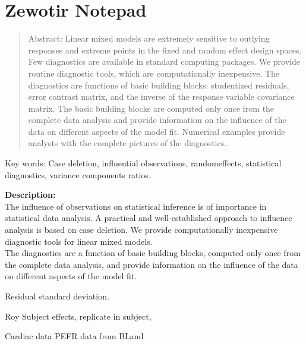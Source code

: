 \documentclass[12pt, a4paper]{article}
\begin{document}



\newpage

\section{Zewotir Notepad}

\begin{quote}
	Abstract: Linear mixed models are extremely sensitive to outlying responses and extreme points in the fixed and random effect design spaces. Few diagnostics are available in standard computing packages. We provide routine diagnostic tools, which are computationally inexpensive. The diagnostics
	are functions of basic building blocks: studentized residuals, error contrast matrix, and the inverse of the response variable covariance matrix. The basic building blocks are computed only once from the complete data analysis and provide information on the influence of the data on different aspects
	of the model fit. Numerical examples provide analysts with the complete pictures of the diagnostics.
\end{quote}
Key words: Case deletion, influential observations, randomeffects, statistical
diagnostics, variance components ratios.


\textbf{Description:}\\ The influence of observations on statistical inference is of importance in statistical data analysis. 
A practical and well-established approach to influence analysis is based on case deletion. 
We provide computationally inexpensive diagnostic tools for linear mixed models. \\
The diagnostics are a function of basic building blocks, computed only once from the complete data analysis, 
and provide information on the influence of the data on different aspects of the model fit.


\bigskip 

Residual standard deviation.

Roy Subject effects, replicate in subject,

Cardiac data PEFR data from BLand
\end{document}
